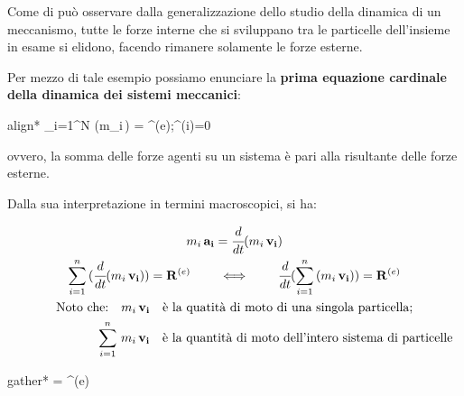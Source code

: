 	Come di può osservare dalla generalizzazione dello studio della dinamica di un meccanismo, tutte le forze interne che si sviluppano tra le particelle dell'insieme in esame si elidono, facendo rimanere solamente le forze esterne.
	
	Per mezzo di tale esempio possiamo enunciare la \textbf{prima equazione cardinale della dinamica dei sistemi meccanici}:
	\begin{empheq}[box=%
	\fbox]{align*}
	\sum_{i=1}^{N} (m_i\,) = ^{(e)}\qquad;\qquad {}^{(i)}=0
	\end{empheq}
	
	ovvero, la somma delle forze agenti su un sistema è pari alla risultante delle forze esterne.
	
	Dalla sua interpretazione in termini macroscopici, si ha:
	
	\begin{gather*}
	m_i\,\mathbf{a_i} = \td{}{t}(m_i\,\mathbf{v_i})\\
	\sum_{i=1}^n\,(\td{}{t}(m_i\,\mathbf{v_i})) = \mathbf{R}^{(e)}\qquad\iff\qquad \td{}{t}(\sum_{i=1}^n\,(m_i\,\mathbf{v_i})) = \mathbf{R}^{(e)}\\
	\text{Noto che:}\quad m_i\,\mathbf{v_i}\quad \text{è la quatità di moto di una singola particella;}\\
	\hspace{23mm} \sum_{i=1}^{n}\,m_i\,\mathbf{v_i}\quad\text{è la quantità di moto dell'intero sistema di particelle}
	\end{gather*}
	\begin{empheq}[box=%
	\fbox]{gather*}
	 = ^{(e)}
	\end{empheq}
	
